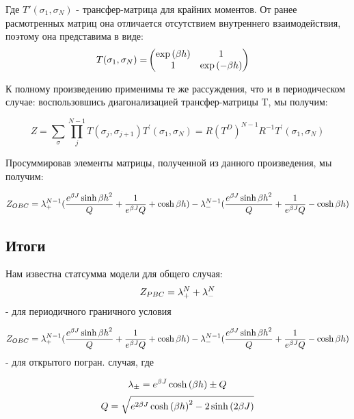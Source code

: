Где $T'(\sigma_{1}, \sigma_{N})$ - трансфер-матрица для крайних моментов. От ранее расмотренных матриц она отличается отсутствием внутреннего взаимодействия, поэтому она представима в виде:
\begin{align*}
  T(\sigma_{1}, \sigma_{N}) = &
  \begin{pmatrix}
    \exp{(\beta h)} & 1 \\
    1 & \exp{(-\beta h)}
  \end{pmatrix}  
\end{align*}

К полному произведению применимы те же рассуждения, что и в периодическом случае: воспользовшись диагонализацией трансфер-матрицы T, мы получим:

\[ Z = \sum_{\sigma}\prod_{j}^{N-1} T(\sigma_{j}, \sigma_{j+1})T^{'}(\sigma_{1}, \sigma_{N}) = R (T^{D})^{N-1} R^{-1} T^{'}(\sigma_{1}, \sigma_{N})\]

Просуммировав элементы матрицы, полученной из данного произведения, мы получим:

\begin{equation}\label{Zobc}
    Z_{OBC} = \lambda_{+}^{N-1}(\frac{e^{\beta J} \sinh{\beta h}^2}{Q} + \frac{1}{e^{\beta J}Q} +  \cosh{\beta h}) - \lambda_{-}^{N-1}(\frac{e^{\beta J} \sinh{\beta h}^2}{Q} + \frac{1}{e^{\beta J}Q} -  \cosh{\beta h}) 
\end{equation}

\subsection{Итоги}
Нам известна статсумма модели для общего случая: 
\[ Z_{PBC} = \lambda_{+}^{N} + \lambda _{-} ^{N} \]
 - для периодичного граничного условия
 
\[ Z_{OBC} = \lambda_{+}^{N-1}(\frac{e^{\beta J} \sinh{\beta h}^2}{Q} + \frac{1}{e^{\beta J}Q} +  \cosh{\beta h}) - \lambda_{-}^{N-1}(\frac{e^{\beta J} \sinh{\beta h}^2}{Q} + \frac{1}{e^{\beta J}Q} -  \cosh{\beta h}) \]
- для открытого погран. случая, где 

\[ \lambda_{\pm} = e^{\beta J}  \cosh{(\beta h)} \pm Q\]
\[ Q = \sqrt{e^{2\beta J} \cosh{(\beta h)}^{2} - 2 \sinh{(2\beta J)}} \]